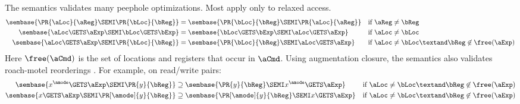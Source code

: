 The semantics validates many peephole optimizations.  Most apply only to
relaxed access.
\begin{align*}
  \sembase{\PR{\aLoc}{\aReg} \SEMI \PR{\bLoc}{\bReg}} &=
  \sembase{\PR{\bLoc}{\bReg}\SEMI \PR{\aLoc}{\aReg}} &&\text{if } \aReg\neq\bReg
  \\
  \sembase{\aLoc \GETS \aExp \SEMI \bLoc  \GETS \bExp} &=
  \sembase{\bLoc  \GETS \bExp\SEMI \aLoc \GETS \aExp} &&\text{if } \aLoc\neq\bLoc
  \\
  \sembase{\aLoc \GETS \aExp  \SEMI \PR{\bLoc}{\bReg}} &=
  \sembase{\PR{\bLoc}{\bReg} \SEMI\aLoc \GETS \aExp} &&\text{if }
  \aLoc\neq\bLoc \textand \bReg\not\in\free(\aExp)%
\end{align*}
Here $\free(\aCmd)$ is the set of locations and registers that occur in $\aCmd$.
Using augmentation closure, the semantics also validates roach-motel reorderings \cite{SevcikThesis}.  For
example, on read/write pairs:
  \begin{align*}
    \sembase{x^\amode \GETS \aExp \SEMI\PR{y}{\bReg}} &\supseteq
    \sembase{\PR{y}{\bReg}  \SEMI x^\amode\GETS \aExp} 
    &&\text{if }
    \aLoc\neq\bLoc \textand \bReg\not\in\free(\aExp)%
    \\
    \sembase{x \GETS \aExp \SEMI\PR[\amode]{y}{\bReg}} &\supseteq
    \sembase{\PR[\amode]{y}{\bReg}  \SEMI x\GETS \aExp} 
    &&\text{if }
    \aLoc\neq\bLoc \textand \bReg\not\in\free(\aExp)%
  \end{align*}



